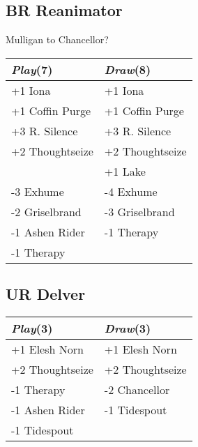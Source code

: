\documentclass{article}
\renewcommand *\contentsname{Contents}
\begin{document}
\begin{multicols}{2}
\subsection*{BR Reanimator}
Mulligan to Chancellor?\begin{center}
\begin{tabular}{| l | l |}
\hline
\textit{Play}(7) & \textit{Draw}(8) \\
\hline
\cellcolor[HTML]{BBDDBB}\small{+1 Iona} & \cellcolor[HTML]{BBDDBB}\small{+1 Iona}\\
\cellcolor[HTML]{BBDDBB}\small{+1 Coffin Purge} & \cellcolor[HTML]{BBDDBB}\small{+1 Coffin Purge}\\
\cellcolor[HTML]{BBDDBB}\small{+3 R. Silence} & \cellcolor[HTML]{BBDDBB}\small{+3 R. Silence}\\
\cellcolor[HTML]{BBDDBB}\small{+2 Thoughtseize} & \cellcolor[HTML]{BBDDBB}\small{+2 Thoughtseize}\\
 & \cellcolor[HTML]{BBDDBB}\small{+1 Lake}\\
\cellcolor[HTML]{DDBBBB}\small{-3 Exhume} & \cellcolor[HTML]{DDBBBB}\small{-4 Exhume}\\
\cellcolor[HTML]{DDBBBB}\small{-2 Griselbrand} & \cellcolor[HTML]{DDBBBB}\small{-3 Griselbrand}\\
\cellcolor[HTML]{DDBBBB}\small{-1 Ashen Rider} & \cellcolor[HTML]{DDBBBB}\small{-1 Therapy}\\
\cellcolor[HTML]{DDBBBB}\small{-1 Therapy} & \\
\hline
\end{tabular}
\end{center}
\subsection*{UR Delver}
\begin{center}
\begin{tabular}{| l | l |}
\hline
\textit{Play}(3) & \textit{Draw}(3) \\
\hline
\cellcolor[HTML]{BBDDBB}\small{+1 Elesh Norn} & \cellcolor[HTML]{BBDDBB}\small{+1 Elesh Norn}\\
\cellcolor[HTML]{BBDDBB}\small{+2 Thoughtseize} & \cellcolor[HTML]{BBDDBB}\small{+2 Thoughtseize}\\
\cellcolor[HTML]{DDBBBB}\small{-1 Therapy} & \cellcolor[HTML]{DDBBBB}\small{-2 Chancellor}\\
\cellcolor[HTML]{DDBBBB}\small{-1 Ashen Rider} & \cellcolor[HTML]{DDBBBB}\small{-1 Tidespout}\\
\cellcolor[HTML]{DDBBBB}\small{-1 Tidespout} & \\
\hline
\end{tabular}
\end{center}

\end{multicols}
\end{document}
